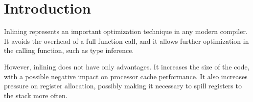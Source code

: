 \section{Introduction}

Inlining represents an important optimization technique in any modern
compiler.  It avoids the overhead of a full function call, and it
allows further optimization in the calling function, such as type
inference.

However, inlining does not have only advantages.  It increases the
size of the code, with a possible negative impact on processor cache
performance.  It also increases pressure on register allocation,
possibly making it necessary to spill registers to the stack more
often.
